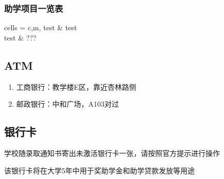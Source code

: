 \subsubsection[助学项目一览表]{助学项目一览表}
\begin{tblr}[
        long,
        theme = {no-caption},
    ]{
        cells  = {c,m},
    }
    test & test \\
    test & ???
\end{tblr}

\subsection[ATM]{ATM\footnotemark}
\begin{enumerate}
    \item 工商银行：教学楼E区，靠近杏林路侧
    \item 邮政银行：中和广场，A103对过
\end{enumerate}

\subsection[银行卡]{银行卡}
学校随录取通知书寄出未激活银行卡一张，请按照官方提示进行操作

该银行卡将在大学5年中用于奖助学金和助学贷款发放等用途

\textbf{}
